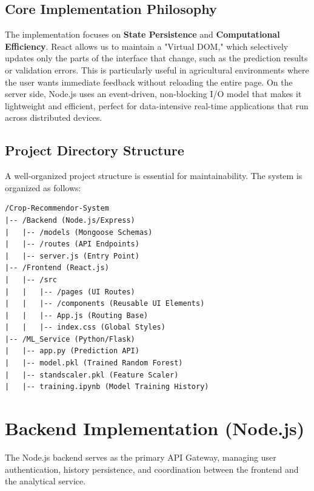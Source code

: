 \documentclass[12pt,a4paper]{report}
\begin{document}
\subsection{Core Implementation Philosophy}
The implementation focuses on \textbf{State Persistence} and \textbf{Computational Efficiency}. React allows us to maintain a "Virtual DOM," which selectively updates only the parts of the interface that change, such as the prediction results or validation errors. This is particularly useful in agricultural environments where the user wants immediate feedback without reloading the entire page. On the server side, Node.js uses an event-driven, non-blocking I/O model that makes it lightweight and efficient, perfect for data-intensive real-time applications that run across distributed devices.

\subsection{Project Directory Structure}
A well-organized project structure is essential for maintainability. The system is organized as follows:
\begin{verbatim}
/Crop-Recommendor-System
|-- /Backend (Node.js/Express)
|   |-- /models (Mongoose Schemas)
|   |-- /routes (API Endpoints)
|   |-- server.js (Entry Point)
|-- /Frontend (React.js)
|   |-- /src
|   |   |-- /pages (UI Routes)
|   |   |-- /components (Reusable UI Elements)
|   |   |-- App.js (Routing Base)
|   |   |-- index.css (Global Styles)
|-- /ML_Service (Python/Flask)
|   |-- app.py (Prediction API)
|   |-- model.pkl (Trained Random Forest)
|   |-- standscaler.pkl (Feature Scaler)
|   |-- training.ipynb (Model Training History)
\end{verbatim}

\section{Backend Implementation (Node.js)}
The Node.js backend serves as the primary API Gateway, managing user authentication, history persistence, and coordination between the frontend and the analytical service.
\end{document}

